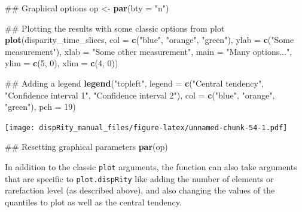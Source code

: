 \documentclass[]{book}
\newenvironment{Shaded}{\begin{snugshade}}{\end{snugshade}}
\newcommand{\KeywordTok}[1]{\textcolor[rgb]{0.13,0.29,0.53}{\textbf{#1}}}
\newcommand{\DataTypeTok}[1]{\textcolor[rgb]{0.13,0.29,0.53}{#1}}
\newcommand{\DecValTok}[1]{\textcolor[rgb]{0.00,0.00,0.81}{#1}}
\newcommand{\StringTok}[1]{\textcolor[rgb]{0.31,0.60,0.02}{#1}}
\newcommand{\NormalTok}[1]{#1}
\theoremstyle{definition}
\theoremstyle{definition}
\theoremstyle{remark}
\begin{document}
\begin{Shaded}
\begin{Highlighting}[]
\NormalTok{## Graphical options}
\NormalTok{op <-}\StringTok{ }\KeywordTok{par}\NormalTok{(}\DataTypeTok{bty =} \StringTok{"n"}\NormalTok{)}

\NormalTok{## Plotting the results with some classic options from plot}
\KeywordTok{plot}\NormalTok{(disparity_time_slices, }\DataTypeTok{col =} \KeywordTok{c}\NormalTok{(}\StringTok{"blue"}\NormalTok{, }\StringTok{"orange"}\NormalTok{, }\StringTok{"green"}\NormalTok{),}
    \DataTypeTok{ylab =} \KeywordTok{c}\NormalTok{(}\StringTok{"Some measurement"}\NormalTok{), }\DataTypeTok{xlab =} \StringTok{"Some other measurement"}\NormalTok{,}
    \DataTypeTok{main =} \StringTok{"Many options..."}\NormalTok{, }\DataTypeTok{ylim =} \KeywordTok{c}\NormalTok{(}\DecValTok{5}\NormalTok{, }\DecValTok{0}\NormalTok{), }\DataTypeTok{xlim =} \KeywordTok{c}\NormalTok{(}\DecValTok{4}\NormalTok{, }\DecValTok{0}\NormalTok{))}

\NormalTok{## Adding a legend}
\KeywordTok{legend}\NormalTok{(}\StringTok{"topleft"}\NormalTok{, }\DataTypeTok{legend =} \KeywordTok{c}\NormalTok{(}\StringTok{"Central tendency"}\NormalTok{,}
                             \StringTok{"Confidence interval 1"}\NormalTok{,}
                            \StringTok{"Confidence interval 2"}\NormalTok{),}
      \DataTypeTok{col =} \KeywordTok{c}\NormalTok{(}\StringTok{"blue"}\NormalTok{, }\StringTok{"orange"}\NormalTok{, }\StringTok{"green"}\NormalTok{), }\DataTypeTok{pch =} \DecValTok{19}\NormalTok{)}
\end{Highlighting}
\end{Shaded}

\texttt{[image: dispRity\_manual\_files/figure-latex/unnamed-chunk-54-1.pdf]}

\begin{Shaded}
\begin{Highlighting}[]
\NormalTok{## Resetting graphical parameters}
\KeywordTok{par}\NormalTok{(op)}
\end{Highlighting}
\end{Shaded}

In addition to the classic \texttt{plot} arguments, the function can
also take arguments that are specific to \texttt{plot.dispRity} like
adding the number of elements or rarefaction level (as described above),
and also changing the values of the quantiles to plot as well as the
central tendency.
\end{document}
